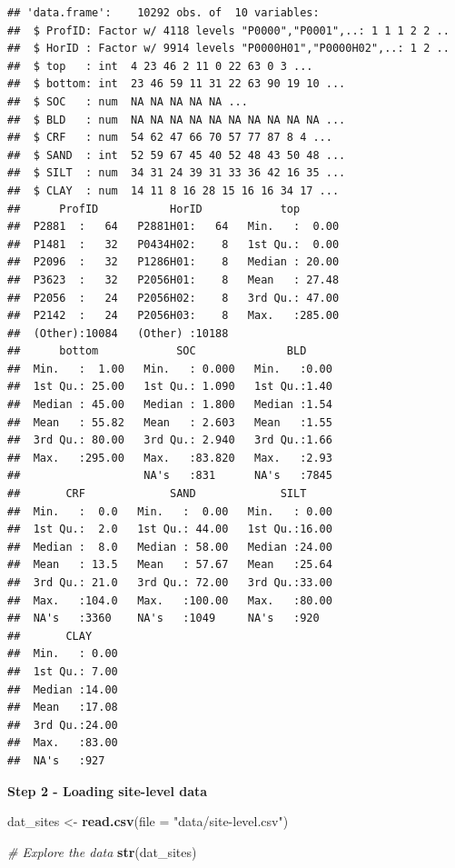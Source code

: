 \documentclass[10pt,b5paper,]{book}
\newenvironment{Shaded}{\begin{snugshade}}{\end{snugshade}}
\newcommand{\CommentTok}[1]{\textcolor[rgb]{0.56,0.35,0.01}{\textit{#1}}}
\newcommand{\DataTypeTok}[1]{\textcolor[rgb]{0.13,0.29,0.53}{#1}}
\newcommand{\KeywordTok}[1]{\textcolor[rgb]{0.13,0.29,0.53}{\textbf{#1}}}
\newcommand{\NormalTok}[1]{#1}
\newcommand{\StringTok}[1]{\textcolor[rgb]{0.31,0.60,0.02}{#1}}
\theoremstyle{definition}
\theoremstyle{definition}
\theoremstyle{definition}
\theoremstyle{remark}
\begin{document}
\begin{verbatim}
## 'data.frame':    10292 obs. of  10 variables:
##  $ ProfID: Factor w/ 4118 levels "P0000","P0001",..: 1 1 1 2 2 ..
##  $ HorID : Factor w/ 9914 levels "P0000H01","P0000H02",..: 1 2 ..
##  $ top   : int  4 23 46 2 11 0 22 63 0 3 ...
##  $ bottom: int  23 46 59 11 31 22 63 90 19 10 ...
##  $ SOC   : num  NA NA NA NA NA ...
##  $ BLD   : num  NA NA NA NA NA NA NA NA NA NA ...
##  $ CRF   : num  54 62 47 66 70 57 77 87 8 4 ...
##  $ SAND  : int  52 59 67 45 40 52 48 43 50 48 ...
##  $ SILT  : num  34 31 24 39 31 33 36 42 16 35 ...
##  $ CLAY  : num  14 11 8 16 28 15 16 16 34 17 ...
##      ProfID           HorID            top        
##  P2881  :   64   P2881H01:   64   Min.   :  0.00  
##  P1481  :   32   P0434H02:    8   1st Qu.:  0.00  
##  P2096  :   32   P1286H01:    8   Median : 20.00  
##  P3623  :   32   P2056H01:    8   Mean   : 27.48  
##  P2056  :   24   P2056H02:    8   3rd Qu.: 47.00  
##  P2142  :   24   P2056H03:    8   Max.   :285.00  
##  (Other):10084   (Other) :10188                   
##      bottom            SOC              BLD      
##  Min.   :  1.00   Min.   : 0.000   Min.   :0.00  
##  1st Qu.: 25.00   1st Qu.: 1.090   1st Qu.:1.40  
##  Median : 45.00   Median : 1.800   Median :1.54  
##  Mean   : 55.82   Mean   : 2.603   Mean   :1.55  
##  3rd Qu.: 80.00   3rd Qu.: 2.940   3rd Qu.:1.66  
##  Max.   :295.00   Max.   :83.820   Max.   :2.93  
##                   NA's   :831      NA's   :7845  
##       CRF             SAND             SILT      
##  Min.   :  0.0   Min.   :  0.00   Min.   : 0.00  
##  1st Qu.:  2.0   1st Qu.: 44.00   1st Qu.:16.00  
##  Median :  8.0   Median : 58.00   Median :24.00  
##  Mean   : 13.5   Mean   : 57.67   Mean   :25.64  
##  3rd Qu.: 21.0   3rd Qu.: 72.00   3rd Qu.:33.00  
##  Max.   :104.0   Max.   :100.00   Max.   :80.00  
##  NA's   :3360    NA's   :1049     NA's   :920    
##       CLAY      
##  Min.   : 0.00  
##  1st Qu.: 7.00  
##  Median :14.00  
##  Mean   :17.08  
##  3rd Qu.:24.00  
##  Max.   :83.00  
##  NA's   :927
\end{verbatim}

\textbf{Step 2 - Loading site-level data}

\begin{Shaded}
\begin{Highlighting}[]
\NormalTok{dat_sites <-}\StringTok{ }\KeywordTok{read.csv}\NormalTok{(}\DataTypeTok{file =} \StringTok{"data/site-level.csv"}\NormalTok{)}

\CommentTok{# Explore the data}
\KeywordTok{str}\NormalTok{(dat_sites)}
\end{Highlighting}
\end{Shaded}
\end{document}
